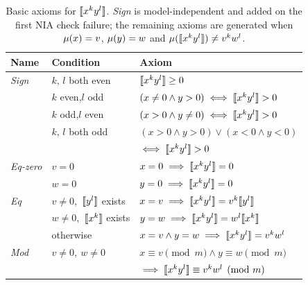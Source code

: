\begin{table}[ht]
	\centering
	\setlength{\tabcolsep}{1.2em}
	\renewcommand{\arraystretch}{1.3}
	\begin{tabular}{@{}lll@{}}
		\hline
		\textbf{Name}    & \textbf{Condition}               & \textbf{Axiom}                                        \\
		\hline
		\textit{Sign}    & $k,\,l$ both even                & $\llbracket x^k y^l \rrbracket \geq 0$                               \\
		                 & $k$ even,\;$l$ odd               & $(x \neq 0 \land y > 0) \iff \llbracket x^k y^l \rrbracket > 0$      \\
		                 & $k$ odd,\;$l$ even               & $(x > 0 \land y \neq 0) \iff \llbracket x^k y^l \rrbracket > 0$      \\
		                 & $k,\,l$ both odd                 & $(x{>}0 \land y{>}0) \lor (x{<}0 \land y{<}0)$        \\
		                 &                                  & $\iff \llbracket x^k y^l \rrbracket > 0$                             \\
		\hline
		\textit{Eq-zero} & $v = 0$                          & $x = 0 \implies \llbracket x^k y^l \rrbracket = 0$                   \\
		                 & $w = 0$                          & $y = 0 \implies \llbracket x^k y^l \rrbracket = 0$                   \\
		\hline
		\textit{Eq}      & $v \neq 0$,\ $\llbracket y^l \rrbracket$ exists & $x = v \implies \llbracket x^k y^l \rrbracket = v^k \llbracket y^l \rrbracket$      \\
		                 & $w \neq 0$,\ $\llbracket x^k \rrbracket$ exists & $y = w \implies \llbracket x^k y^l \rrbracket = w^l \llbracket x^k \rrbracket$      \\
		                 & otherwise                        & $x = v \land y = w \implies \llbracket x^k y^l \rrbracket = v^k w^l$ \\
		\hline
		\textit{Mod}     & $v \neq 0,\ w \neq 0$            & $x \equiv v \pmod{m} \land y \equiv w \pmod{m}$       \\
		                 &                                  & $\implies \llbracket x^k y^l \rrbracket \equiv v^k w^l \pmod{m}$     \\
		\hline
	\end{tabular}
	\vspace{0.9em}
	\caption{%
		Basic axioms for $\llbracket x^k y^l \rrbracket$. \textit{Sign} is model-independent and added on the first NIA check failure; the remaining axioms are generated when $\mu(x)=v$, $\mu(y)=w$ and $\mu(\llbracket x^k y^l \rrbracket)\neq v^kw^l$.\label{tab:mul-axioms}}
\end{table}
